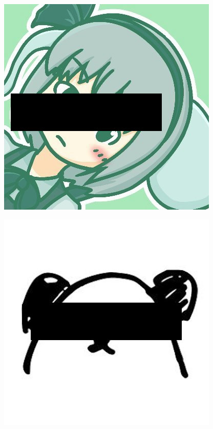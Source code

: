 \documentclass[
  lualatex,
  aspectratio=169,
  14pt
]{beamer}
\begin{document}
\begin{frame}
\begin{columns}[c]
\begin{column}{.17\textwidth}
      \includegraphics[width=\linewidth]{./images/yude.jpg}

      \includegraphics[width=\linewidth]{./images/kurari.jpg}
    \end{column}
  \end{columns}
\end{frame}
\end{document}
